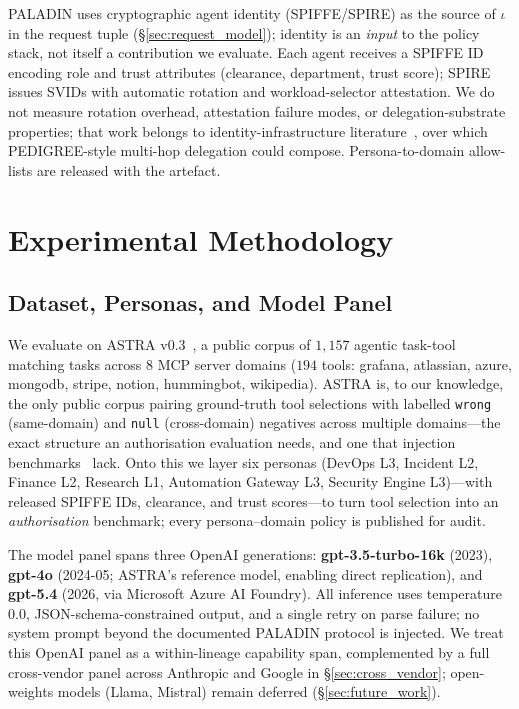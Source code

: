 \documentclass[sigconf,review,anonymous]{acmart}
\begin{document}
PALADIN uses cryptographic agent identity (SPIFFE/SPIRE) as the source of $\iota$ in the request tuple (\S\ref{sec:request_model}); identity is an \emph{input} to the policy stack, not itself a contribution we evaluate. Each agent receives a SPIFFE ID encoding role and trust attributes (clearance, department, trust score); SPIRE issues SVIDs with automatic rotation and workload-selector attestation. We do not measure rotation overhead, attestation failure modes, or delegation-substrate properties; that work belongs to identity-infrastructure literature~\cite{rampalli2026pedigree,south2025authenticated}, over which PEDIGREE-style multi-hop delegation could compose. Persona-to-domain allow-lists are released with the artefact.

\section{Experimental Methodology}
\label{sec:methodology}

\subsection{Dataset, Personas, and Model Panel}
\label{sec:dataset}
\label{sec:model_panel}

We evaluate on ASTRA v0.3~\cite{elhelou2025astra}, a public corpus of $1{,}157$ agentic task-tool matching tasks across $8$ MCP server domains ($194$ tools: grafana, atlassian, azure, mongodb, stripe, notion, hummingbot, wikipedia). ASTRA is, to our knowledge, the only public corpus pairing ground-truth tool selections with labelled \texttt{wrong} (same-domain) and \texttt{null} (cross-domain) negatives across multiple domains---the exact structure an authorisation evaluation needs, and one that injection benchmarks~\cite{zhan2024injecagent,debenedetti2024agentdojo,ruan2024toolemu} lack. Onto this we layer six personas (DevOps L3, Incident L2, Finance L2, Research L1, Automation Gateway L3, Security Engine L3)---with released SPIFFE IDs, clearance, and trust scores---to turn tool selection into an \emph{authorisation} benchmark; every persona--domain policy is published for audit.

The model panel spans three OpenAI generations: \textbf{gpt-3.5-turbo-16k} (2023), \textbf{gpt-4o} (2024-05; ASTRA's reference model, enabling direct replication), and \textbf{gpt-5.4} (2026, via Microsoft Azure AI Foundry). All inference uses temperature $0.0$, JSON-schema-constrained output, and a single retry on parse failure; no system prompt beyond the documented PALADIN protocol is injected. We treat this OpenAI panel as a within-lineage capability span, complemented by a full cross-vendor panel across Anthropic and Google in \S\ref{sec:cross_vendor}; open-weights models (Llama, Mistral) remain deferred (\S\ref{sec:future_work}).
\end{document}
